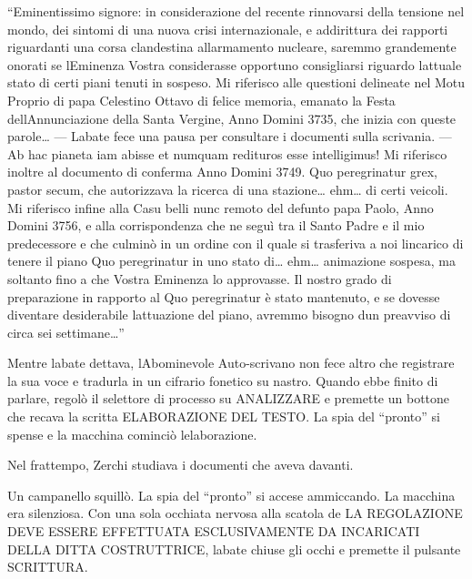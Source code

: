 	``Eminentissimo signore: in considerazione del recente rinnovarsi della
	tensione nel mondo, dei sintomi di una nuova crisi internazionale, e
	addirittura dei rapporti riguardanti una corsa clandestina
	all\textquotesingle armamento nucleare, saremmo grandemente onorati se
	l\textquotesingle Eminenza Vostra considerasse opportuno consigliarsi
	riguardo l\textquotesingle attuale stato di certi piani tenuti in
	sospeso. Mi riferisco alle questioni delineate nel Motu Proprio di papa
	Celestino Ottavo di felice memoria, emanato la Festa
	dell\textquotesingle Annunciazione della Santa Vergine, Anno Domini
	3735, che inizia con queste parole\ldots{} --- L\textquotesingle abate
	fece una pausa per consultare i documenti sulla scrivania. --- Ab hac
	pianeta iam abisse et numquam redituros esse intelligimus! Mi riferisco
	inoltre al documento di conferma Anno Domini 3749. Quo peregrinatur
	grex, pastor secum, che autorizzava la ricerca di una stazione\ldots{}
	ehm\ldots{} di certi veicoli. Mi riferisco infine alla Casu belli nunc
	remoto del defunto papa Paolo, Anno Domini 3756, e alla corrispondenza
	che ne seguì tra il Santo Padre e il mio predecessore e che culminò in
	un ordine con il quale si trasferiva a noi l\textquotesingle incarico di
	tenere il piano Quo peregrinatur in uno stato di\ldots{} ehm\ldots{}
	animazione sospesa, ma soltanto fino a che Vostra Eminenza lo
	approvasse. Il nostro grado di preparazione in rapporto al Quo
	peregrinatur è stato mantenuto, e se dovesse diventare desiderabile
	l\textquotesingle attuazione del piano, avremmo bisogno
	d\textquotesingle un preavviso di circa sei settimane\ldots''
	
	Mentre l\textquotesingle abate dettava, l\textquotesingle Abominevole
	Auto-scrivano non fece altro che registrare la sua voce e tradurla in un
	cifrario fonetico su nastro. Quando ebbe finito di parlare, regolò il
	selettore di processo su ANALIZZARE e premette un bottone che recava la
	scritta ELABORAZIONE DEL TESTO. La spia del ``pronto'' si spense e la
	macchina cominciò l\textquotesingle elaborazione.
	
	Nel frattempo, Zerchi studiava i documenti che aveva davanti.
	
	Un campanello squillò. La spia del ``pronto'' si accese ammiccando. La
	macchina era silenziosa. Con una sola occhiata nervosa alla scatola de
	LA REGOLAZIONE DEVE ESSERE EFFETTUATA ESCLUSIVAMENTE DA INCARICATI DELLA
	DITTA COSTRUTTRICE, l\textquotesingle abate chiuse gli occhi e premette
	il pulsante SCRITTURA.
	

